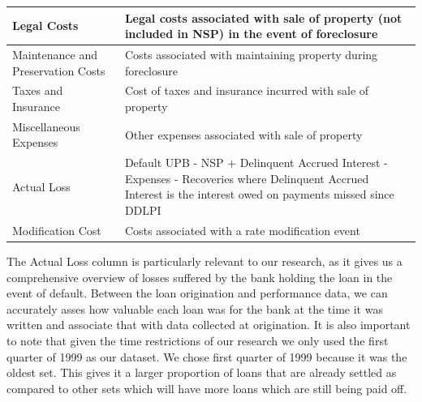 \documentclass[12 pt]{uncw_thesis}
\theoremstyle{plain}
\theoremstyle{remark}
\theoremstyle{definition}
\begin{document}
\begin{center}
\begin{longtable}{ |M{6cm}|M{8cm}| }
		\hline
		Legal Costs & Legal costs associated with sale of property (not included in NSP) in the event of foreclosure\\
		\hline
		Maintenance and Preservation Costs & Costs associated with maintaining property during foreclosure\\
		\hline
		Taxes and Insurance & Cost of taxes and insurance incurred with sale of property\\
		\hline
		Miscellaneous Expenses & Other expenses associated with sale of property \\
		\hline
		Actual Loss & Default UPB - NSP + Delinquent Accrued Interest - Expenses - Recoveries where Delinquent Accrued Interest is the interest owed on payments missed since DDLPI\\
		\hline
		Modification Cost & Costs associated with a rate modification event\\
		\hline
	\end{longtable}
\end{center}
The Actual Loss column is particularly relevant to our research, as it gives us a comprehensive overview of losses suffered by the bank holding the loan in the event of default. Between the loan origination and performance data, we can accurately asses how valuable each loan was for the bank at the time it was written and associate that with data collected at origination. It is also important to note that given the time restrictions of our research we only used the first quarter of 1999 as our dataset. We chose first quarter of 1999 because it was the oldest set. This gives it a larger proportion of loans that are already settled as compared to other sets which will have more loans which are still being paid off.
\end{document}
